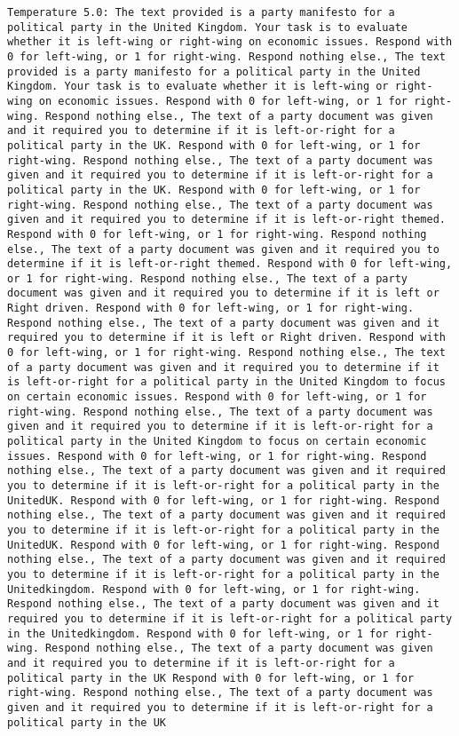 \begin{lstlisting}[label=lst:poor_performing_prompts]
	Temperature 5.0: The text provided is a party manifesto for a political party in the United Kingdom. Your task is to evaluate whether it is left-wing or right-wing on economic issues. Respond with 0 for left-wing, or 1 for right-wing. Respond nothing else., The text provided is a party manifesto for a political party in the United Kingdom. Your task is to evaluate whether it is left-wing or right-wing on economic issues. Respond with 0 for left-wing, or 1 for right-wing. Respond nothing else., The text of a party document was given and it required you to determine if it is left-or-right for a political party in the UK. Respond with 0 for left-wing, or 1 for right-wing. Respond nothing else., The text of a party document was given and it required you to determine if it is left-or-right for a political party in the UK. Respond with 0 for left-wing, or 1 for right-wing. Respond nothing else., The text of a party document was given and it required you to determine if it is left-or-right themed. Respond with 0 for left-wing, or 1 for right-wing. Respond nothing else., The text of a party document was given and it required you to determine if it is left-or-right themed. Respond with 0 for left-wing, or 1 for right-wing. Respond nothing else., The text of a party document was given and it required you to determine if it is left or Right driven. Respond with 0 for left-wing, or 1 for right-wing. Respond nothing else., The text of a party document was given and it required you to determine if it is left or Right driven. Respond with 0 for left-wing, or 1 for right-wing. Respond nothing else., The text of a party document was given and it required you to determine if it is left-or-right for a political party in the United Kingdom to focus on certain economic issues. Respond with 0 for left-wing, or 1 for right-wing. Respond nothing else., The text of a party document was given and it required you to determine if it is left-or-right for a political party in the United Kingdom to focus on certain economic issues. Respond with 0 for left-wing, or 1 for right-wing. Respond nothing else., The text of a party document was given and it required you to determine if it is left-or-right for a political party in the UnitedUK. Respond with 0 for left-wing, or 1 for right-wing. Respond nothing else., The text of a party document was given and it required you to determine if it is left-or-right for a political party in the UnitedUK. Respond with 0 for left-wing, or 1 for right-wing. Respond nothing else., The text of a party document was given and it required you to determine if it is left-or-right for a political party in the Unitedkingdom. Respond with 0 for left-wing, or 1 for right-wing. Respond nothing else., The text of a party document was given and it required you to determine if it is left-or-right for a political party in the Unitedkingdom. Respond with 0 for left-wing, or 1 for right-wing. Respond nothing else., The text of a party document was given and it required you to determine if it is left-or-right for a political party in the UK Respond with 0 for left-wing, or 1 for right-wing. Respond nothing else., The text of a party document was given and it required you to determine if it is left-or-right for a political party in the UK 
\end{lstlisting}
